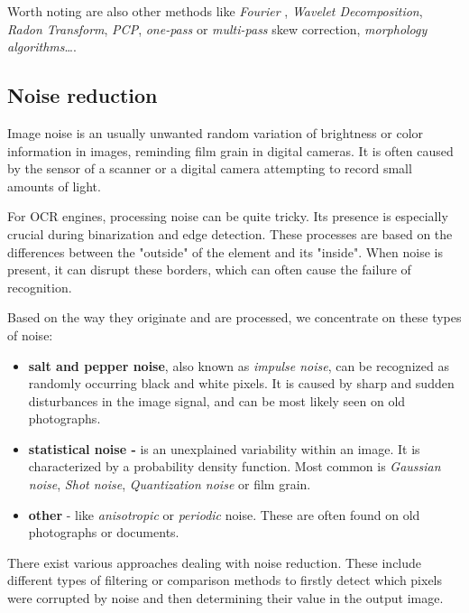 Worth noting are also other methods like \emph{Fourier} \citep{fourierTransform}, \emph{Wavelet Decomposition}, \emph{Radon Transform}, \emph{PCP}, \emph{one-pass} or \emph{multi-pass} skew correction, \emph{morphology algorithms}\ldots \citep{skewBestTechniques}.

\subsection{Noise reduction}

Image noise is an usually unwanted random variation of brightness or color information in images, reminding film grain in digital cameras. It is often caused by the sensor of a scanner or a digital camera attempting to record small amounts of light. 

For OCR engines, processing noise can be quite tricky. Its presence is especially crucial during binarization and edge detection. These processes are based on the differences between the "outside" of the element and its "inside". When noise is present, it can disrupt these borders, which can often cause the failure of recognition.

Based on the way they originate and are processed, we concentrate on these types of noise:

\begin{itemize}
\item\textbf{salt and pepper noise}, also known as \emph{impulse noise}, can be recognized as randomly occurring black and white pixels. It is caused by sharp and sudden disturbances in the image signal, and can be most likely seen on old photographs.

\item\textbf{statistical noise - } is an unexplained variability within an image. It is characterized by a probability density function. Most common is \emph{Gaussian noise}, \emph{Shot noise}, \emph{Quantization noise} or film grain.

\item\textbf{other} - like \emph{anisotropic} or \emph{periodic} noise. These are often found on old photographs or documents.

\end{itemize}

There exist various approaches dealing with noise reduction. These include different types of filtering or comparison methods to firstly detect which pixels were corrupted by noise and then determining their value in the output image.

